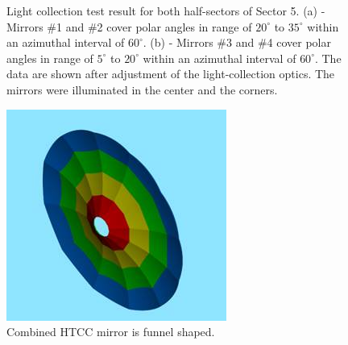 \begin{figure}
\begin{subfigure}[b]{0.5\textwidth}
    \caption{} \label{fig:subfig1_b}
\end{subfigure}
\caption{Light collection test result for both half-sectors of Sector 5. (a) - Mirrors \#1 and \#2 cover polar angles in range of $20^\circ$ to $35^\circ$  within an azimuthal interval of $60^\circ$. (b) - Mirrors \#3 and \#4 cover polar angles in range of $5^\circ$ to $20^\circ$  within an azimuthal interval of $60^\circ$. The data are shown after adjustment of the light-collection optics. The mirrors were illuminated in the center and the corners.} 
\label{fig:subfig}
\end{figure}

\begin{figure}[ht]
    \centering
    \includegraphics[width=1.0\linewidth,trim={0 0cm 0 0},clip]{images/Colored_Mirror.jpg}
    \caption{Combined HTCC mirror is funnel shaped.}
    \label{fig:Colored_Mirror}
\end{figure}


